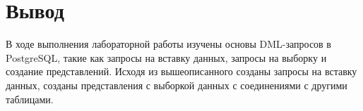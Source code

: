 \documentclass[a4paper,14pt]{extarticle}
\begin{document}
  \section*{Вывод}
  В ходе выполнения лабораторной работы изучены основы DML-запросов в PostgreSQL, такие как запросы на вставку данных, запросы на выборку и создание представлений. Исходя из вышеописанного созданы запросы на вставку данных, созданы представления с выборкой данных с соединениями с другими таблицами.
\end{document}
